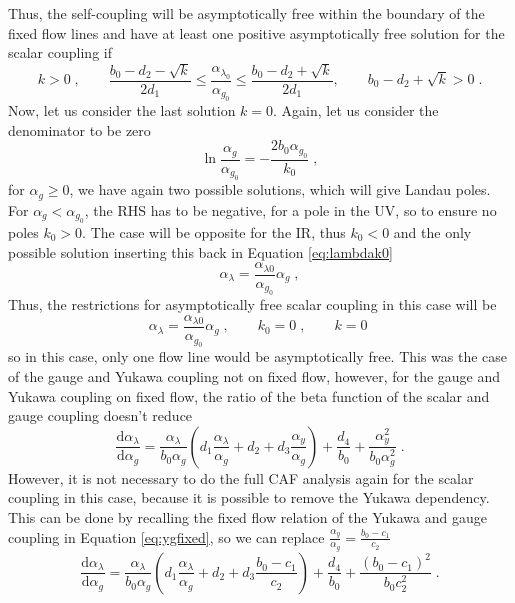 Thus, the self-coupling will be asymptotically free within the boundary of the fixed flow lines and have at least one positive asymptotically free solution for the scalar coupling if
\begin{equation}
    k>0\;,\quad\quad  \frac{b_0-d_2-\sqrt{k}}{2d_1}\le \frac{\alpha_{\lambda_0}}{\alpha_{g_0}}\le \frac{b_0-d_2+\sqrt{k}}{2d_1}, \quad\quad {b_0-d_2+\sqrt{k}}>0\;.
\end{equation}
Now, let us consider the last solution $k=0$. Again, let us consider the denominator to be zero
\begin{equation}
    \ln\frac{\alpha_g}{\alpha_{g_0}}=-\frac{2b_0\alpha_{g_0}}{k_0}\;,
\end{equation}
for $\alpha_g\ge0$, we have again two possible solutions, which will give Landau poles. For $\alpha_g<\alpha_{g_0}$, the RHS has to be negative, for a pole in the UV, so to ensure no poles $k_0>0$. The case will be opposite for the IR, thus $k_0<0$ and the only possible solution inserting this back in Equation \ref{eq:lambdak0}
\begin{equation}
    \alpha_{\lambda} = \frac{ \alpha_{\lambda0}  }{ \alpha_{g_0}  } \alpha_g\;,
\end{equation}
Thus, the restrictions for asymptotically free scalar coupling in this case will be
\begin{equation}
    \alpha_{\lambda} = \frac{ \alpha_{\lambda0}  }{ \alpha_{g_0}  } \alpha_g\;,\quad\quad k_0=0\;, \quad\quad k=0\;
\end{equation}
so in this case, only one flow line would be asymptotically free. 
This was the case of the gauge and Yukawa coupling not on fixed flow, however, for the gauge and Yukawa coupling on fixed flow, the ratio of the beta function of the scalar and gauge coupling doesn't reduce
\begin{equation}
    \frac{\text{d} \alpha_\lambda}{\text{d}\alpha_g}=\frac{\alpha_\lambda}{b_0\alpha_g}\left(d_1\frac{\alpha_\lambda}{\alpha_g} + d_2+d_3\frac{\alpha_y}{\alpha_g}\right)+\frac{d_4}{b_0}+\frac{\alpha_y^2}{b_0\alpha_g^2}\;.
\end{equation}
However, it is not necessary to do the full CAF analysis again for the scalar coupling in this case, because it is possible to remove the Yukawa dependency. This can be done by recalling the fixed flow relation of the Yukawa and gauge coupling in Equation \ref{eq:ygfixed}, so we can replace $\frac{\alpha_y}{\alpha_g}=\frac{b_0-c_1}{c_2}$ 
\begin{equation}
    \frac{\text{d} \alpha_\lambda}{\text{d}\alpha_g}=\frac{\alpha_\lambda}{b_0\alpha_g}\left(d_1\frac{\alpha_\lambda}{\alpha_g} + d_2+d_3\frac{b_0-c_1}{c_2}\right)+\frac{d_4}{b_0}+\frac{(b_0-c_1)^2}{b_0c_2^2}\;.
\end{equation}
